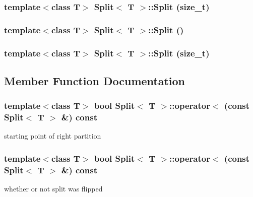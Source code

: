 \subsubsection{\setlength{\rightskip}{0pt plus 5cm}template$<$class T$>$ {\bf Split}$<$ T $>$::{\bf Split} (size\_\-t)}\label{classSplit_a1}


\subsubsection{\setlength{\rightskip}{0pt plus 5cm}template$<$class T$>$ {\bf Split}$<$ T $>$::{\bf Split} ()}\label{classSplit_a3}


\subsubsection{\setlength{\rightskip}{0pt plus 5cm}template$<$class T$>$ {\bf Split}$<$ T $>$::{\bf Split} (size\_\-t)}\label{classSplit_a4}




\subsection{Member Function Documentation}
\subsubsection{\setlength{\rightskip}{0pt plus 5cm}template$<$class T$>$ bool {\bf Split}$<$ T $>$::operator$<$ (const {\bf Split}$<$ T $>$ \&) const}\label{classSplit_a5}


starting point of right partition 

\subsubsection{\setlength{\rightskip}{0pt plus 5cm}template$<$class T$>$ bool {\bf Split}$<$ T $>$::operator$<$ (const {\bf Split}$<$ T $>$ \&) const}\label{classSplit_a2}


whether or not split was flipped 



